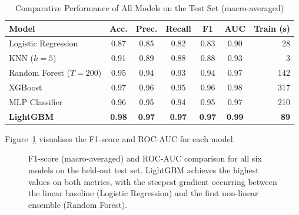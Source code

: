 \begin{table}[H]
\centering
\caption{Comparative Performance of All Models on the Test Set (macro-averaged)}
\label{tab:model_compare}
\begin{tabular}{lcccccr}
\toprule
\textbf{Model} & \textbf{Acc.} & \textbf{Prec.} & \textbf{Recall} & \textbf{F1} & \textbf{AUC} & \textbf{Train (s)} \\
\midrule
Logistic Regression       & 0.87 & 0.85 & 0.82 & 0.83 & 0.90 & 28  \\
KNN ($k = 5$)             & 0.91 & 0.89 & 0.88 & 0.88 & 0.93 & 3   \\
Random Forest ($T = 200$) & 0.95 & 0.94 & 0.93 & 0.94 & 0.97 & 142 \\
XGBoost                   & 0.97 & 0.96 & 0.95 & 0.96 & 0.98 & 317 \\
MLP Classifier            & 0.96 & 0.95 & 0.94 & 0.95 & 0.97 & 210 \\
\textbf{LightGBM}         & \textbf{0.98} & \textbf{0.97} & \textbf{0.97} & \textbf{0.97} & \textbf{0.99} & \textbf{89} \\
\bottomrule
\end{tabular}
\end{table}

Figure~\ref{fig:model_bars} visualises the F1-score and ROC-AUC for each model.

\begin{figure}[H]
\centering
{}
\caption{F1-score (macro-averaged) and ROC-AUC comparison for all six models on the held-out test set. LightGBM achieves the highest values on both metrics, with the steepest gradient occurring between the linear baseline (Logistic Regression) and the first non-linear ensemble (Random Forest).}
\label{fig:model_bars}
\end{figure}

